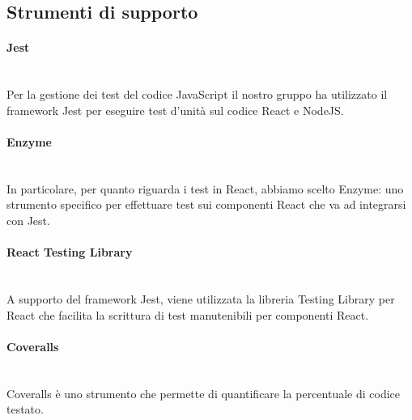 \subsection{Strumenti di supporto}
\paragraph{Jest}\mbox{}\\ [1mm]
Per la gestione dei test del codice JavaScript il nostro gruppo ha utilizzato il framework Jest per eseguire test d'unità sul codice React e NodeJS.
\paragraph{Enzyme}\mbox{}\\ [1mm]
In particolare, per quanto riguarda i test in React, abbiamo scelto Enzyme: uno strumento specifico per effettuare test sui componenti React che va ad integrarsi con Jest.
\paragraph{React Testing Library}\mbox{}\\ [1mm]
A supporto del framework Jest, viene utilizzata la libreria Testing Library per React che facilita la scrittura di test manutenibili per componenti React.
\paragraph{Coveralls}\mbox{}\\ [1mm]
Coveralls è uno strumento che permette di quantificare la percentuale di codice testato.